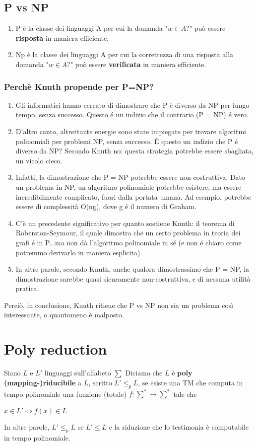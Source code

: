 \documentclass[a4paper, 12pt]{article}
\begin{document}
\subsection{P vs NP}
\begin{enumerate}
\item P \`e la classe dei linguaggi A per cui la domanda "$w \in A?$" pu\`o essere \textbf{risposta} in maniera efficiente.
\item Np \`e la classe dei linguaggi A per cui la correttezza di una risposta alla domanda "$w \in A?$" pu\`o essere \textbf{verificata} in maniera efficiente.
\end{enumerate}
\subsubsection{Perch\`e Knuth propende per P=NP?}
\begin{enumerate}
\item Gli informatici hanno cercato di dimostrare che P è diverso da NP per lungo tempo, senza successo. Questo é un indizio che il contrario (P = NP) é vero.
\item D’altro canto, altrettante energie sono state impiegate per trovare algoritmi polinomiali per problemi NP, senza successo. É questo un indizio che P é diverso da NP? Secondo Knuth no: questa strategia potrebbe essere sbagliata, un vicolo cieco.
\item Infatti, la dimostrazione che P = NP potrebbe essere non-costruttiva. Dato un problema in NP, un algoritmo polinomiale potrebbe esistere, ma essere incredibilmente complicato, fuori dalla portata umana. Ad esempio, potrebbe essere di complessità O(ng), dove g é il numero di Graham.
\item C’è un precedente significativo per quanto sostiene Knuth: il teorema di Roberston-Seymour, il quale dimostra che un certo problema in teoria dei grafi é in P...ma non dà l’algoritmo polinomiale in sé (e non é chiaro come potremmo
derivarlo in maniera esplicita).
\item In altre parole, secondo Knuth, anche qualora dimostrassimo che P = NP, la dimostrazione sarebbe quasi sicuramente non-costruttiva, e di nessuna utilità pratica.
\end{enumerate}
Perci\`o, in conclusione, Knuth ritiene che P vs NP non sia un problema cos\`i interessante, o quantomeno \`e malposto.


\newpage
\section{Poly reduction}
Siano $L$ e $L'$ linguaggi sull'alfabeto $\sum$ Diciamo che $L$ \`e \textbf{poly (mapping-)riducibile} a $L$, scritto $L' \leq_p L$, se esiste una TM che computa in tempo polinomiale una funzione (totale) $f: \sum^{*} \rightarrow \sum^{*}$ tale che \begin{center}
$x \in L' \iff f(x) \in L$
\end{center}
In altre parole, $L' \leq_p L$ se $L' \leq L$ e la riduzione che lo testimonia \`e computabile in tempo polinomiale.
\end{document}
